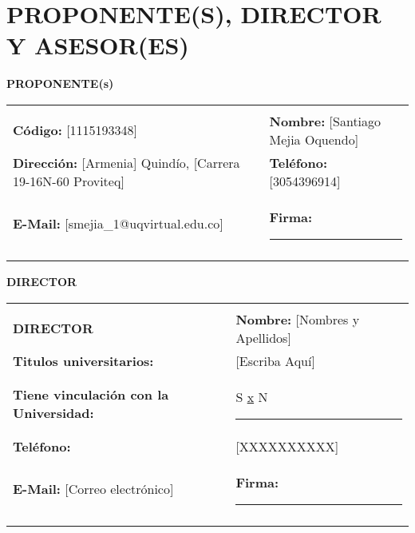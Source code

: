 \documentclass[12pt,letterpaper]{article}
\begin{document}
\maketitle
\tableofcontents
\newpage

\section{PROPONENTE(S), DIRECTOR Y ASESOR(ES)}
\textbf{PROPONENTE(s)} \\

\begin{table}[htb]		
	\begin{center}
		\begin{tabularx}{\textwidth}{|XX|}
			\hline
			 & \\
			\textbf{Código: }[1115193348] & \textbf{Nombre: }[Santiago Mejia Oquendo] \\
			\textbf{Dirección: }[Armenia] Quindío, [Carrera 19-16N-60 Proviteq] & \textbf{Teléfono: }[3054396914] \\
			\textbf{E-Mail: }[smejia\_1@uqvirtual.edu.co] & \textbf{Firma: } \rule{50mm}{0.1mm} \\
			 & \\
			\hline
		\end{tabularx}
	\end{center}
\end{table}	

\textbf{DIRECTOR}
\begin{table}[htb]		
	\begin{center}
		\begin{tabularx}{\textwidth}{|XX|}
			\hline
			 & \\
			\textbf{DIRECTOR} & \textbf{Nombre: }[Nombres y Apellidos] \\
			\textbf{Titulos universitarios: }  & [Escriba Aquí] \\
			\textbf{Tiene vinculación con la Universidad:} & S \underline{x} N \rule{6mm}{0.1mm}\\
			\textbf{Teléfono: } & [XXXXXXXXXX] \\
			\textbf{E-Mail: }[Correo electrónico] & \textbf{Firma: } \rule{50mm}{0.1mm} \\
			 & \\
			\hline
		\end{tabularx}
	\end{center}
\end{table}	\newline
\end{document}
